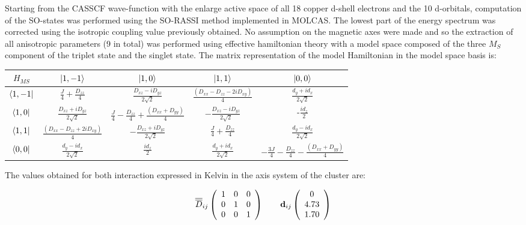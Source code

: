 \documentclass[10pt]{report}
\numberwithin{equation}{section}
\begin{document}
Starting from the CASSCF wave-function with the enlarge active space of all 18 copper d-shell electrons and the 10 d-orbitals, computation of the SO-states was performed using the SO-RASSI method implemented in MOLCAS.
The lowest part of the energy spectrum was corrected using the isotropic coupling value previously obtained.
No assumption on the magnetic axes were made and so the extraction of all anisotropic parameters (9 in total) was performed using effective hamiltonian theory with a model space composed of the three $M_S$ component of the triplet state and the singlet state.
The matrix representation of the model Hamiltonian in the model space basis is:
\begin{center}
    \begin{tabular}{c | c c c c}
        $H_{MS}$ & $\ket{1,-1}$ & $\ket{1,0}$ & $\ket{1,1}$ & $\ket{0,0}$\\
        \hline
        $\bra{1,-1}$ & $\frac{J}{4}+\frac{D_{zz}}{4}$ & $\frac{D_{xz}-iD_{yz}}{2\sqrt{2}}$ & $\frac{(D_{xx}-D_{zz}-2iD_{xy})}{4} $& $\frac{d_y+id_x}{2\sqrt{2}}$\\
        $\bra{1,0}$ & $\frac{D_{xz}+iD_{yz}}{2\sqrt{2}}$ &$ \frac{J}{4} -\frac{D_{zz}}{4} +\frac{(D_{xx}+D_{yy})}{4}$& $-\frac{D_{xz}-iD_{yz}}{2\sqrt{2}}$ & -$\frac{id_z}{2}$ \\
        $\bra{1,1}$ &$\frac{(D_{xx}-D_{zz}+2iD_{xy})}{4} $ & $-\frac{D_{xz}+iD_{yz}}{2\sqrt{2}}$ & $\frac{J}{4}+\frac{D_{zz}}{4}$ & $\frac{d_y-id_x}{2\sqrt{2}}$\\
        $\bra{0,0}$ & $\frac{d_y-id_x}{2\sqrt{2}}$  & $\frac{id_z}{2}$  &$\frac{d_y+id_x}{2\sqrt{2}}$  & $-\frac{3J}{4}-\frac{D_{zz}}{4}-\frac{(D_{xx}+D_{yy})}{4}$\\
    \end{tabular}
\end{center}

The values obtained for both interaction expressed in Kelvin in the axis system of the cluster are:

\[ \overline{\overline{D}}_{ij} \left( \begin{array}{c c c}
    1 & 0 & 0\\
    0 & 1 & 0\\
    0 & 0 & 1
    \end{array} \right)
    \qquad
    \vb{d}_{ij}
    \left( \begin{array}{c}
    0  \\
    4.73  \\
    1.70
    \end{array} \right)
    \]
    
\end{document}
